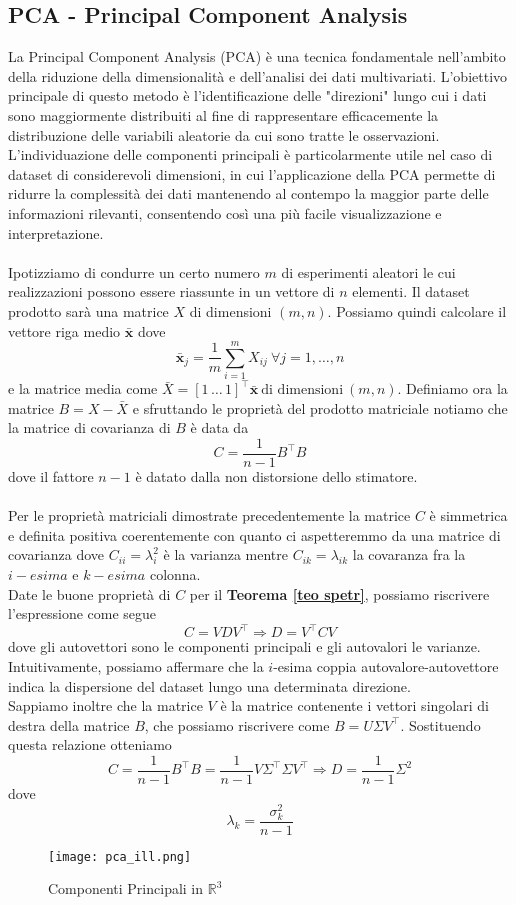 \documentclass[11pt]{article}
\newcommand{\R}{\mathbb{R}} %
\begin{document}
\subsection{PCA - Principal Component Analysis}
La Principal Component Analysis (PCA) è una tecnica fondamentale nell'ambito della riduzione della dimensionalità e dell'analisi dei dati multivariati. L'obiettivo principale di questo metodo è l'identificazione delle "direzioni" lungo cui i dati sono maggiormente distribuiti al fine di rappresentare efficacemente la distribuzione delle variabili aleatorie da cui sono tratte le osservazioni. L'individuazione delle componenti principali è particolarmente utile nel caso di dataset di considerevoli dimensioni, in cui l'applicazione della PCA permette di ridurre la complessità dei dati mantenendo al contempo la maggior parte delle informazioni rilevanti, consentendo così una più facile visualizzazione e interpretazione.\\
\\
Ipotizziamo di condurre un certo numero $m$ di esperimenti aleatori le cui realizzazioni possono essere riassunte in un vettore di $n$ elementi. Il dataset prodotto sarà una matrice $X$ di dimensioni $(m,n)$. Possiamo quindi calcolare il vettore riga medio $\bar{\mathbf{x}}$ dove $$ \bar{\mathbf{x}}_j= \frac1m \sum_{i=1}^m X_{ij} \ \forall j=1, \dots, n$$
e la matrice media come  $ \bar{X}= [1 \, \dots \, 1]^\top \bar{\mathbf{x}} \ \text{di dimensioni} \ (m,n)$.
Definiamo ora la matrice $B= X-\bar{X}$ e sfruttando le proprietà del prodotto matriciale notiamo che la matrice di covarianza di $B$ è data da $$ C = \frac{1}{n-1} B^\top B$$ dove il fattore $n-1$ è datato dalla non distorsione dello stimatore.\\
\\
Per le proprietà matriciali dimostrate precedentemente la matrice $C$ è simmetrica e definita positiva coerentemente con quanto ci aspetteremmo da una matrice di covarianza dove $C_{ii} = 	\lambda_i^2$ è la varianza mentre $C_{ik} = 	\lambda_{ik}$ la covaranza fra la $i-esima$ e $k-esima$ colonna.\\
Date le buone proprietà di $C$ per il \textbf{Teorema \ref{teo spetr}}, possiamo riscrivere l'espressione come segue
\[
C = VDV^\top \Rightarrow D = V^\top CV
\]
dove gli autovettori sono le componenti principali e gli autovalori le varianze. Intuitivamente, possiamo affermare che la $i$-esima coppia autovalore-autovettore indica la dispersione del dataset lungo una determinata direzione.\\
Sappiamo inoltre che la matrice $V$ è la matrice contenente i vettori singolari di destra della matrice $B$, che possiamo riscrivere come $B = U\Sigma V^\top$. Sostituendo questa relazione otteniamo
$$
C = \frac{1}{n-1} B^\top B = \frac{1}{n-1} V \Sigma^\top \Sigma V^\top \Rightarrow D = \frac{1}{n-1} \Sigma^2
$$
dove $$
\lambda_k = \frac{\sigma_k^2}{n-1}
$$ 
\begin{figure}[h]
    \centering
    \texttt{[image: pca\_ill.png]}
    \caption{Componenti Principali in $\R^3$}
    \label{fig:pca_ill}
\end{figure}
    
\end{document}
